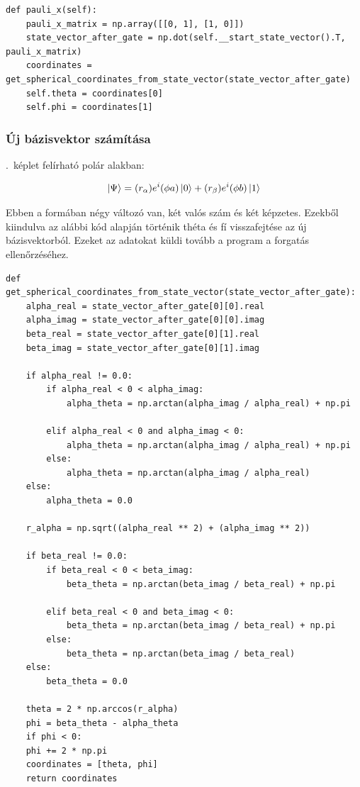 \documentclass[
]{thesis-ekf}
\theoremstyle{definition}
\theoremstyle{remark}
\begin{document}
\begin{lstlisting}[caption={Pauli-X kapu alkalmazása a bázisvektorra}]
def pauli_x(self):
	pauli_x_matrix = np.array([[0, 1], [1, 0]])
	state_vector_after_gate = np.dot(self.__start_state_vector().T, pauli_x_matrix)
	coordinates = get_spherical_coordinates_from_state_vector(state_vector_after_gate)
	self.theta = coordinates[0]
	self.phi = coordinates[1]
\end{lstlisting}

\subsubsection{Új bázisvektor számítása}
\Az{\ref{qubitallapot}}.~képlet felírható polár alakban:

\begin{equation}
	\ket{\Psi}=(r_\alpha)e^i(\phi a)\ket{0}+(r_\beta)e^i(\phi b)\ket{1}
\end{equation}

Ebben a formában négy változó van, két valós szám és két képzetes. Ezekből kiindulva az alábbi kód alapján történik théta és fí visszafejtése az új bázisvektorból. Ezeket az adatokat küldi tovább a program a forgatás ellenőrzéséhez.

\begin{lstlisting}[caption={Fí és théta kinyerése az új bázisvektorból}]
def get_spherical_coordinates_from_state_vector(state_vector_after_gate):
	alpha_real = state_vector_after_gate[0][0].real
	alpha_imag = state_vector_after_gate[0][0].imag
	beta_real = state_vector_after_gate[0][1].real
	beta_imag = state_vector_after_gate[0][1].imag
	
	if alpha_real != 0.0:
		if alpha_real < 0 < alpha_imag:
			alpha_theta = np.arctan(alpha_imag / alpha_real) + np.pi
	
		elif alpha_real < 0 and alpha_imag < 0:
			alpha_theta = np.arctan(alpha_imag / alpha_real) + np.pi
		else:
			alpha_theta = np.arctan(alpha_imag / alpha_real)
	else:
		alpha_theta = 0.0
	
	r_alpha = np.sqrt((alpha_real ** 2) + (alpha_imag ** 2))
	
	if beta_real != 0.0:
		if beta_real < 0 < beta_imag:
			beta_theta = np.arctan(beta_imag / beta_real) + np.pi
	
		elif beta_real < 0 and beta_imag < 0:
			beta_theta = np.arctan(beta_imag / beta_real) + np.pi
		else:
			beta_theta = np.arctan(beta_imag / beta_real)
	else:
		beta_theta = 0.0
	
	theta = 2 * np.arccos(r_alpha)
	phi = beta_theta - alpha_theta
	if phi < 0:
	phi += 2 * np.pi
	coordinates = [theta, phi]
	return coordinates
\end{lstlisting}
\end{document}
